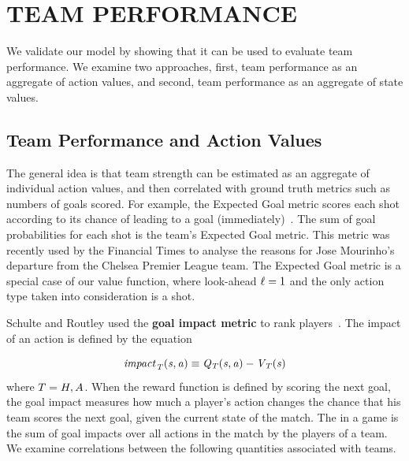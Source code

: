 \section{TEAM PERFORMANCE}
\label{sec:perform}
We validate our model by showing that it can be used to evaluate team performance. We examine two approaches, first, team performance as an aggregate of action values, and second, team performance as an aggregate of state values.

\subsection{Team Performance and Action Values}
The general idea is that team strength can be estimated as an aggregate of individual action values, and then correlated with ground truth metrics such as numbers of goals scored. For example, the Expected Goal metric scores each shot according to its chance of leading to a goal (immediately)~\citep{Tegen2015}. The sum of goal probabilities for each shot is the team's Expected Goal metric. This metric was recently used by the Financial Times to analyse the reasons for Jose Mourinho's departure from the Chelsea Premier League team. The Expected Goal metric is a special case of our value function, where look-ahead $\ell = 1$ and the only action type taken into consideration is a shot. 

Schulte and Routley used the \textbf{goal impact metric} to rank players~\citep{Routley2015a}. The impact of an action is defined by the equation

\begin{equation}
\it{impact}_{T}(s,a) \equiv Q_{T}(s,a) - V_{T}(s)
\end{equation}
where $T = H,A$.
When the reward function is defined by scoring the next goal, the goal impact measures how much a player's action changes the chance that his team scores the next goal, given the current state of the match. The  in a game is the sum of goal impacts over all actions in the match by the players of a team. We examine correlations between the following quantities associated with teams.

